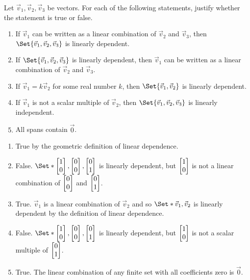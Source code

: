 \begin{exercises}
\begin{problist}
		\prob Let $\vec v_{1}, \vec v_{2}, \vec v_{3}$ be vectors. For each of the following statements,
		justify whether the statement is true or false.
		\begin{enumerate}
			\item If $\vec v_{1}$ can be written as a linear combination
			of $\vec v_{2}$ and $\vec v_{3}$, then $\Set{\vec
				v_1,\vec v_2,\vec v_3}$ is linearly dependent.
			
			\item If $\Set{\vec v_1,\vec v_2,\vec v_3}$ is linearly dependent,
			then $\vec v_{1}$ can be written as a linear combination
			of $\vec v_{2}$ and $\vec v_{3}$.
			
			\item If $\vec v_{1}=k\vec v_{2}$ for some real number $k$,
			then $\Set{\vec v_1,\vec v_2}$ is linearly dependent.
			
			\item If $\vec v_{1}$ is not a scalar multiple of $\vec
			v_{2}$, then $\Set{\vec v_1,\vec v_2,\vec v_3}$ is
			linearly independent.
			
			\item All spans contain $\vec 0$.
		\end{enumerate}
		\begin{solution}
			\begin{enumerate}
				\item True by the geometric definition of linear dependence.
				\item False. $\Set*{\mat{1\\0},\mat{0\\0},\mat{0\\1}}$ is linearly
				dependent, but $\mat{1\\0}$ is not a linear combination of $\mat{0\\0}$ and $\mat{0\\1}$.
				\item True. $\vec{v}_{1}$ is a linear combination of $\vec{v}_{2}$ and so 
				$\Set*{\vec {v}_{1},\vec{v}_{2}}$ is linearly dependent by the definition
				of linear dependence.
				\item False. $\Set*{\mat{1\\0},\mat{0\\0},\mat{0\\1}}$ is linearly dependent, 
				but $\mat{1\\0}$ is not a scalar multiple of $\mat{0\\1}$.
				\item True. The linear combination of any finite set with all coefficients zero is $\vec {0}$.
			\end{enumerate}
		\end{solution}
	\end{problist}
\end{exercises}
